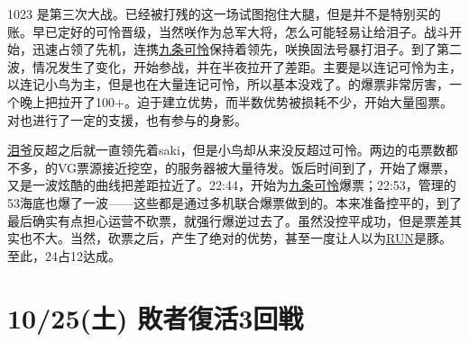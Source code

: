 1023 是第三次大战。已经被打残的这一场试图抱住大腿，但是并不是特别买的账。早已定好的可怜晋级，当然咲作为总军大将，怎么可能轻易让给泪子。战斗开始，迅速占领了先机，连携\uline{九条可怜}保持着领先，咲换固法号暴打泪子。到了第二波，情况发生了变化，开始参战，并在半夜拉开了差距。主要是以连记可怜为主，以连记小鸟为主，但是也在大量连记可怜，所以基本没戏了。的爆票非常厉害，一个晚上把拉开了100+。迫于建立优势，而半数优势被损耗不少，开始大量囤票。对也进行了一定的支援，也有参与的身影。

\uline{泪爷}反超之后就一直领先着saki，但是小鸟却从来没反超过可怜。两边的屯票数都不多，的VG票源接近挖空，的服务器被大量待发。饭后时间到了，开始了爆票，又是一波炫酷的曲线把差距拉近了。22:44，开始为\uline{九条可怜}爆票；22:53，管理的53海底也爆了一波——这些都是通过多机联合爆票做到的。本来准备控平的，到了最后确实有点担心运营不砍票，就强行爆逆过去了。虽然没控平成功，但是票差其实也不大。当然，砍票之后，产生了绝对的优势，甚至一度让人以为\uline{RUN}是豚。至此，24占12达成。

\section{10/25(土) 敗者復活3回戦}

